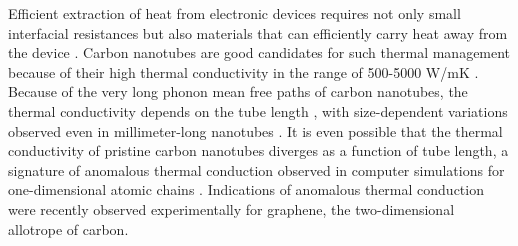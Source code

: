 Efficient extraction of heat from electronic devices requires not only small interfacial resistances but also materials that can efficiently carry heat away from the device \cite{pop10}. Carbon nanotubes  \cite{iijima91} are good candidates for such thermal management \cite{kumar11} because of their high thermal conductivity in the range of 500-5000 W/mK \cite{marconnet13}. Because of the very long phonon mean free paths of carbon nanotubes, the thermal conductivity depends on the tube length \cite{chang08}, with size-dependent variations observed even in millimeter-long nanotubes \cite{chang_personal}. It is even possible that the thermal conductivity of pristine carbon nanotubes diverges as a function of tube length, a signature of anomalous thermal conduction observed in computer simulations for one-dimensional atomic chains \cite{lepri03,mai07,dhar08}. Indications of anomalous thermal conduction were recently observed experimentally \cite{xu14} for graphene, the two-dimensional allotrope of carbon.



